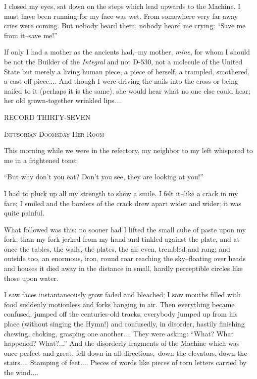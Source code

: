 \documentclass[11pt,openany]{book}
\begin{document}
I closed my eyes, sat down on the steps which lead upwards to the Machine. I must have been running for my face was wet. From somewhere very far away cries were coming. But nobody heard them; nobody heard me crying: ``Save me from it--save me!''

If only I had a mother as the ancients had,--my mother, \emph{mine}, for whom I should be not the Builder of the \emph{Integral} and not D-530, not a molecule of the United State but merely a living human piece, a piece of herself, a trampled, smothered, a cast-off piece.... And though I were driving the nails into the cross or being nailed to it (perhaps it is the same), she would hear what no one else could hear; her old grown-together wrinkled lips....

\begin{center}\textsc{RECORD THIRTY-SEVEN}\end{center}

\begin{center}\textsc{Infusorian Doomsday Her Room}\end{center}

This morning while we were in the refectory, my neighbor to my left whispered to me in a frightened tone:

``But why don't you eat? Don't you see, they are looking at you!''

I had to pluck up all my strength to show a smile. I felt it--like a crack in my face; I smiled and the borders of the crack drew apart wider and wider; it was quite painful.

What followed was this: no sooner had I lifted the small cube of paste upon my fork, than my fork jerked from my hand and tinkled against the plate, and at once the tables, the walls, the plates, the air even, trembled and rang; and outside too, an enormous, iron, round roar reaching the sky--floating over heads and houses it died away in the distance in small, hardly perceptible circles like those upon water.

I saw faces instantaneously grow faded and bleached; I saw mouths filled with food suddenly motionless and forks hanging in air. Then everything became confused, jumped off the centuries-old tracks, everybody jumped up from his place (without singing the Hymn!) and confusedly, in disorder, hastily finishing chewing, choking, grasping one another.... They were asking: ``What? What happened? What?...'' And the disorderly fragments of the Machine which was once perfect and great, fell down in all directions,--down the elevators, down the stairs.... Stamping of feet.... Pieces of words like pieces of torn letters carried by the wind....
\end{document}
